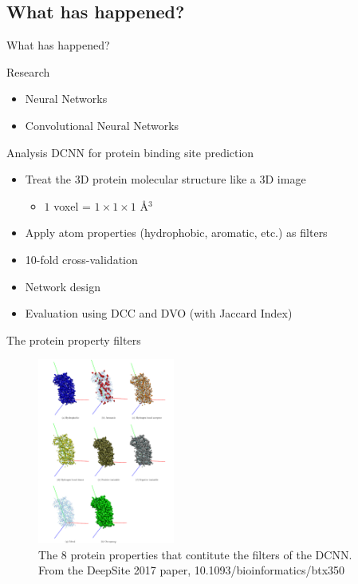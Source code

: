\documentclass{beamer}
\begin{document}
\subsection{What has happened?}

\begin{frame}{What has happened?}
  \begin{block}{Research}
    \begin{itemize}
      \item Neural Networks
      \item Convolutional Neural Networks
    \end{itemize}
  \end{block}
  \begin{block}{Analysis}
    DCNN for protein binding site prediction
    \begin{itemize}
      \item Treat the 3D protein molecular structure like a 3D image
      \begin{itemize}
        \item $1$ voxel = $1 \times 1 \times 1 $ \AA$^3$
      \end{itemize}
      \item Apply atom properties (hydrophobic, aromatic, etc.) as filters
      \item 10-fold cross-validation
      \item Network design
      \item Evaluation using DCC and DVO (with Jaccard Index)
    \end{itemize}
  \end{block}
\end{frame}

\begin{frame}{The protein property filters}
  \begin{figure}[h]
    \includegraphics[width=0.4\textwidth]{deepsite_protein_property_filters}
    \caption{The 8 protein properties that contitute the filters of the DCNN.\\\hspace{1mm}
      From the DeepSite 2017 paper, 10.1093/bioinformatics/btx350}
  \end{figure}
\end{frame}
\end{document}

